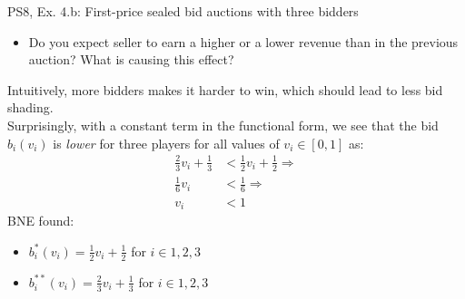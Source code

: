 \begin{frame}{PS8, Ex. 4.b: First-price sealed bid auctions with three bidders}
    \begin{itemize}
      \item[(b)] Do you expect seller to earn a higher or a lower revenue than in the previous auction? What is causing this effect?
    \end{itemize}
    \vspace{-8pt}
    \begin{multicols}{2}
    Intuitively, more bidders makes it harder to win, which should lead to less bid shading.\\\medskip
    Surprisingly, with a constant term in the functional form, we see that the bid $b_i(v_i)$ is \textit{lower} for three players for all values of $v_i\in[0,1]$ as:
    \begin{align*}
      \frac{2}{3}v_i+\frac{1}{3}&<\frac{1}{2}v_i+\frac{1}{2}\Rightarrow\\
      \frac{1}{6}v_i&<\frac{1}{6}\Rightarrow\\
                 v_i&<1
    \end{align*}
    \vfill\null\columnbreak
    BNE found:
    \begin{itemize}
      \item[(3.a)] $b_i^{*}(v_i)=\frac{1}{2}v_i+\frac{1}{2}$ for $i\in1,2,3$
      \item[(4.a)] $b_i^{**}(v_i)=\frac{2}{3}v_i+\frac{1}{3}$ for $i\in1,2,3$
    \end{itemize}
    \vfill\null
    \end{multicols}
\end{frame}


